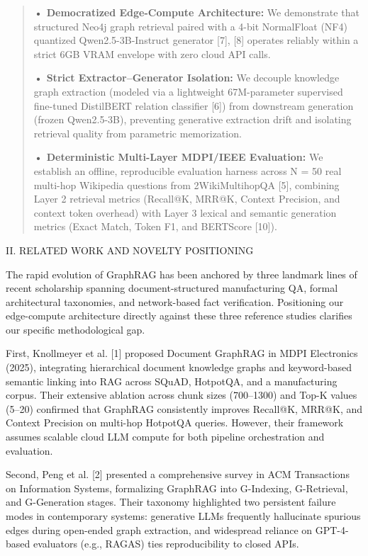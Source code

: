 \begin{quote}
\textbf{• Democratized Edge-Compute Architecture:} We demonstrate that
structured Neo4j graph retrieval paired with a 4-bit NormalFloat (NF4)
quantized Qwen2.5-3B-Instruct generator {[}7{]}, {[}8{]} operates
reliably within a strict 6GB VRAM envelope with zero cloud API calls.

\textbf{• Strict Extractor--Generator Isolation:} We decouple knowledge
graph extraction (modeled via a lightweight 67M-parameter supervised
fine-tuned DistilBERT relation classifier {[}6{]}) from downstream
generation (frozen Qwen2.5-3B), preventing generative extraction drift
and isolating retrieval quality from parametric memorization.

\textbf{• Deterministic Multi-Layer MDPI/IEEE Evaluation:} We establish
an offline, reproducible evaluation harness across N = 50 real multi-hop
Wikipedia questions from 2WikiMultihopQA {[}5{]}, combining Layer 2
retrieval metrics (Recall@K, MRR@K, Context Precision, and context token
overhead) with Layer 3 lexical and semantic generation metrics (Exact
Match, Token F1, and BERTScore {[}10{]}).
\end{quote}

\textsc{II. RELATED WORK AND NOVELTY POSITIONING}

The rapid evolution of GraphRAG has been anchored by three landmark
lines of recent scholarship spanning document-structured manufacturing
QA, formal architectural taxonomies, and network-based fact
verification. Positioning our edge-compute architecture directly against
these three reference studies clarifies our specific methodological gap.

First, Knollmeyer et al. {[}1{]} proposed Document GraphRAG in MDPI
Electronics (2025), integrating hierarchical document knowledge graphs
and keyword-based semantic linking into RAG across SQuAD, HotpotQA, and
a manufacturing corpus. Their extensive ablation across chunk sizes
(700--1300) and Top-K values (5--20) confirmed that GraphRAG
consistently improves Recall@K, MRR@K, and Context Precision on
multi-hop HotpotQA queries. However, their framework assumes scalable
cloud LLM compute for both pipeline orchestration and evaluation.

Second, Peng et al. {[}2{]} presented a comprehensive survey in ACM
Transactions on Information Systems, formalizing GraphRAG into
G-Indexing, G-Retrieval, and G-Generation stages. Their taxonomy
highlighted two persistent failure modes in contemporary systems:
generative LLMs frequently hallucinate spurious edges during open-ended
graph extraction, and widespread reliance on GPT-4-based evaluators
(e.g., RAGAS) ties reproducibility to closed APIs.

